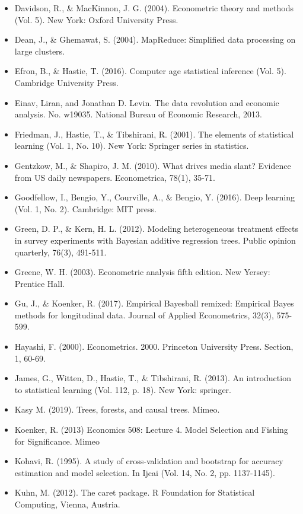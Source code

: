 \documentclass[11pt]{article}
\begin{document}
\begin{itemize}
\item Davidson, R., \& MacKinnon, J. G. (2004). Econometric theory and methods (Vol. 5). New York: Oxford University Press.
\item Dean, J., \& Ghemawat, S. (2004). MapReduce: Simplified data processing on large clusters.
\item Efron, B., \& Hastie, T. (2016). Computer age statistical inference (Vol. 5). Cambridge University Press.
\item Einav, Liran, and Jonathan D. Levin. The data revolution and economic analysis. No. w19035. National Bureau of Economic Research, 2013.
\item Friedman, J., Hastie, T., \& Tibshirani, R. (2001). The elements of statistical learning (Vol. 1, No. 10). New York: Springer series in statistics.
\item Gentzkow, M., \& Shapiro, J. M. (2010). What drives media slant? Evidence from US daily newspapers. Econometrica, 78(1), 35-71.
\item Goodfellow, I., Bengio, Y., Courville, A., \& Bengio, Y. (2016). Deep learning (Vol. 1, No. 2). Cambridge: MIT press.
\item Green, D. P., \& Kern, H. L. (2012). Modeling heterogeneous treatment effects in survey experiments with Bayesian additive regression trees. Public opinion quarterly, 76(3), 491-511.
\item Greene, W. H. (2003). Econometric analysis fifth edition. New Yersey: Prentice Hall.
\item Gu, J., \& Koenker, R. (2017). Empirical Bayesball remixed: Empirical Bayes methods for longitudinal data. Journal of Applied Econometrics, 32(3), 575-599.
\item Hayashi, F. (2000). Econometrics. 2000. Princeton University Press. Section, 1, 60-69.
\item James, G., Witten, D., Hastie, T., \& Tibshirani, R. (2013). An introduction to statistical learning (Vol. 112, p. 18). New York: springer.
\item Kasy M. (2019). Trees, forests, and causal trees. Mimeo.
\item Koenker, R. (2013) Economics 508: Lecture 4. Model Selection and Fishing for Significance. Mimeo
\item Kohavi, R. (1995). A study of cross-validation and bootstrap for accuracy estimation and model selection. In Ijcai (Vol. 14, No. 2, pp. 1137-1145).
\item Kuhn, M. (2012). The caret package. R Foundation for Statistical Computing, Vienna, Austria.

\end{itemize}
\end{document}
